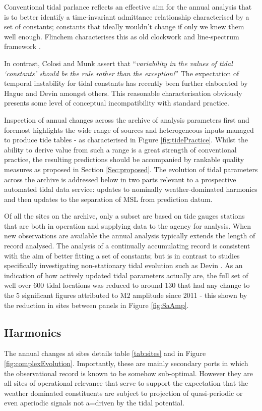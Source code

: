 Conventional tidal parlance reflects an effective aim for the annual analysis that is to better identify a time-invariant admittance relationship characterised by a set of constants; constants that ideally wouldn't change if only we knew them well enough. Flinchem characterises this as old clockwork and  line-spectrum framework \cite{Flinchem:2000kp}. 

In contrast, Colosi and Munk assert that ``\textit{variability in the values of tidal `constants' should be the rule rather than the exception!}'' \cite{Colosi:2006va}
The expectation of temporal instability for tidal constants has recently been further elaborated by Hague \cite{10.1029/2018rg000636} and Devin \cite{10.1002/2017jc013165} amongst others.    This reasonable characterisation obviously presents some level of conceptual incompatibility with standard practice.

Inspection of annual changes across the archive of analysis parameters first and foremost highlights the wide range of sources and heterogeneous inputs managed to produce tide tables - as characterised in Figure \ref{fig:tidePractice}.    Whilst the ability to derive value from such a range is a great strength of conventional practice, the resulting predictions  should be accompanied by rankable quality measures as proposed in Section \ref{Sec:proposed}.
The evolution of tidal parameters across the archive is addressed below in two parts relevant to a prospective automated tidal data service:  updates to nominally weather-dominated harmonics and then updates to the separation of MSL from prediction datum.

Of all the sites on the archive, only a subset are based on tide gauges stations that are both in operation and supplying data to the agency for analysis. When new observations are available the annual analysis typically extends the length of record analysed.   The analysis of a continually accumulating record is consistent with the aim of better fitting a set of constants; but is in contrast to studies specifically investigating non-stationary tidal evolution such as Devin \cite{10.1002/2017jc013165}.
As an indication of how actively updated tidal parameters actually are, the full set of well over 600 tidal locations was reduced to around 130 that had any change to the 5 significant figures attributed to M2 amplitude since 2011 - this shown by the reduction in sites between panels in Figure \ref{fig:SaAmp}.


\subsection{Harmonics}
The annual changes at sites details table \ref{tab:sites} and in Figure \ref{fig:complexEvolution}.
Importantly, these are mainly secondary ports in which the observational record is known to be somehow sub-optimal.    However they are all sites of operational relevance that serve to support the expectation that the weather dominated constituents are subject to projection of quasi-periodic or even aperiodic signals not a=driven by the tidal potential.  


